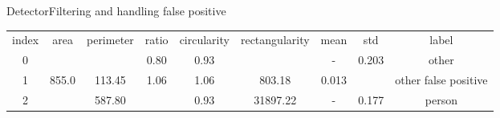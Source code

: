 \documentclass{beamer}
\begin{document}
\begin{frame}[fragile]{Detector}{Filtering and handling false positive}
\tiny
\hspace*{-1cm}\begin{tabular}[h]{ccccccccc}
index & area	& perimeter & 	ratio & circularity & rectangularity & mean & std & label \\
0 & \color{orange}{1243.0} & \color{orange}{146.76} & 0.80 & 0.93 & \color{red}{1545.35} & - & 0.203 & other \\
1 & 855.0 & 113.45 & 1.06 & 1.06 & 803.18 & 0.013 & \color{darkmagenta}{0.020} & other false positive \\
2 & \color{applegreen}{15028.5} & 587.80 & \color{blue}{0.47} & 0.93 & 31897.22 & - & 0.177 & person
\end{tabular}        
\end{frame}
\end{document}
